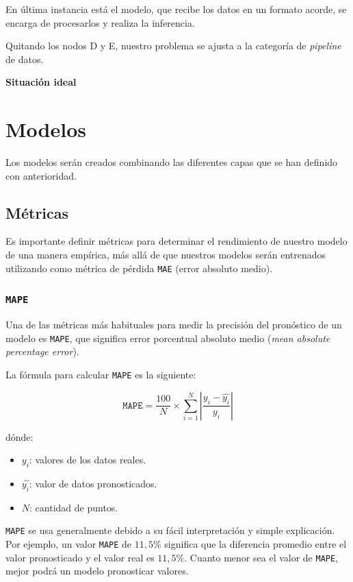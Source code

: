 \documentclass[a4paper,12pt]{article}
\begin{document}
		En última instancia está el modelo, que recibe los datos en un formato acorde, se encarga de procesarlos y realiza la inferencia.
		
		Quitando los nodos D y E, nuestro problema se ajusta a la categoría de \textit{pipeline} de datos.
		
		\textbf{Situación ideal}
		
		
		\section{Modelos}\label{TrainingModel}
		
		Los modelos serán creados combinando las diferentes capas que se han definido con anterioridad.
		
		\subsection{Métricas}
		
		Es importante definir métricas para determinar el rendimiento de nuestro modelo de una manera empírica, más allá de que nuestros modelos serán entrenados utilizando como métrica de pérdida \texttt{MAE} (error absoluto medio).
		
		\subsubsection{\texttt{MAPE}}
		
		Una de las métricas más habituales para medir la precisión del pronóstico de un modelo es \texttt{MAPE}, que significa error porcentual absoluto medio (\textit{mean absolute percentage error}). \citep{MAPE}
		
		La fórmula para calcular \texttt{MAPE} es la siguiente:
		
		$$ \texttt{MAPE} = \frac{100}{N} \times \sum_{i=1}^{N} |\frac{y_i - \hat{y_i}}{y_i}| $$
		
		dónde:
		
		\begin{itemize}[noitemsep, topsep=2pt]
			\item $ y_i$: valores de los datos reales.
			\item $ \hat{y_i}$: valor de datos pronosticados.
			\item $ N $: cantidad de puntos.
		\end{itemize}
		
		\texttt{MAPE} se usa generalmente debido a su fácil interpretación y simple explicación. Por ejemplo, un valor \texttt{MAPE} de $11,5\%$ significa que la diferencia promedio entre el valor pronosticado y el valor real es $11,5\%$. Cuanto menor sea el valor de \texttt{MAPE}, mejor podrá un modelo pronosticar valores.
		
\end{document}
